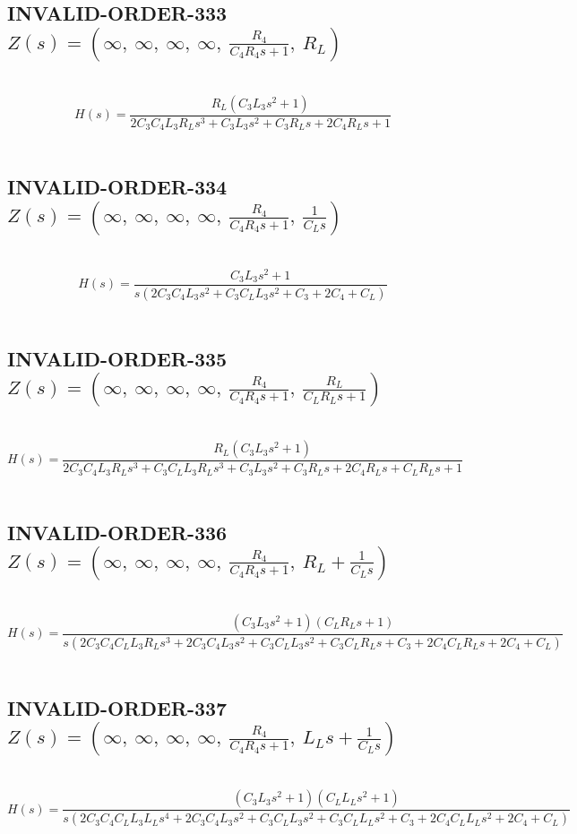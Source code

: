 \documentclass{article}
\begin{document}
\subsection{INVALID-ORDER-333 $Z(s) = \left( \infty, \  \infty, \  \infty, \  \infty, \  \frac{R_{4}}{C_{4} R_{4} s + 1}, \  R_{L}\right)$ } \ 
\textbf{\[H(s) = \frac{R_{L} \left(C_{3} L_{3} s^{2} + 1\right)}{2 C_{3} C_{4} L_{3} R_{L} s^{3} + C_{3} L_{3} s^{2} + C_{3} R_{L} s + 2 C_{4} R_{L} s + 1}\] } \ 
\subsection{INVALID-ORDER-334 $Z(s) = \left( \infty, \  \infty, \  \infty, \  \infty, \  \frac{R_{4}}{C_{4} R_{4} s + 1}, \  \frac{1}{C_{L} s}\right)$ } \ 
\textbf{\[H(s) = \frac{C_{3} L_{3} s^{2} + 1}{s \left(2 C_{3} C_{4} L_{3} s^{2} + C_{3} C_{L} L_{3} s^{2} + C_{3} + 2 C_{4} + C_{L}\right)}\] } \ 
\subsection{INVALID-ORDER-335 $Z(s) = \left( \infty, \  \infty, \  \infty, \  \infty, \  \frac{R_{4}}{C_{4} R_{4} s + 1}, \  \frac{R_{L}}{C_{L} R_{L} s + 1}\right)$ } \ 
\textbf{\[H(s) = \frac{R_{L} \left(C_{3} L_{3} s^{2} + 1\right)}{2 C_{3} C_{4} L_{3} R_{L} s^{3} + C_{3} C_{L} L_{3} R_{L} s^{3} + C_{3} L_{3} s^{2} + C_{3} R_{L} s + 2 C_{4} R_{L} s + C_{L} R_{L} s + 1}\] } \ 
\subsection{INVALID-ORDER-336 $Z(s) = \left( \infty, \  \infty, \  \infty, \  \infty, \  \frac{R_{4}}{C_{4} R_{4} s + 1}, \  R_{L} + \frac{1}{C_{L} s}\right)$ } \ 
\textbf{\[H(s) = \frac{\left(C_{3} L_{3} s^{2} + 1\right) \left(C_{L} R_{L} s + 1\right)}{s \left(2 C_{3} C_{4} C_{L} L_{3} R_{L} s^{3} + 2 C_{3} C_{4} L_{3} s^{2} + C_{3} C_{L} L_{3} s^{2} + C_{3} C_{L} R_{L} s + C_{3} + 2 C_{4} C_{L} R_{L} s + 2 C_{4} + C_{L}\right)}\] } \ 
\subsection{INVALID-ORDER-337 $Z(s) = \left( \infty, \  \infty, \  \infty, \  \infty, \  \frac{R_{4}}{C_{4} R_{4} s + 1}, \  L_{L} s + \frac{1}{C_{L} s}\right)$ } \ 
\textbf{\[H(s) = \frac{\left(C_{3} L_{3} s^{2} + 1\right) \left(C_{L} L_{L} s^{2} + 1\right)}{s \left(2 C_{3} C_{4} C_{L} L_{3} L_{L} s^{4} + 2 C_{3} C_{4} L_{3} s^{2} + C_{3} C_{L} L_{3} s^{2} + C_{3} C_{L} L_{L} s^{2} + C_{3} + 2 C_{4} C_{L} L_{L} s^{2} + 2 C_{4} + C_{L}\right)}\] } \ 
\end{document}
